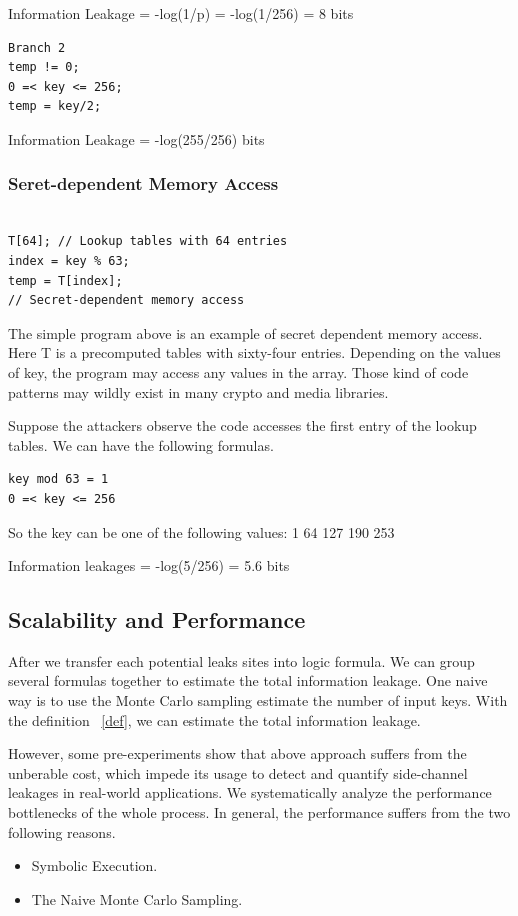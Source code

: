 Information Leakage = -log(1/p) = -log(1/256) = 8 bits

\begin{lstlisting}
Branch 2
temp != 0; 
0 =< key <= 256;
temp = key/2;
\end{lstlisting}

Information Leakage = -log(255/256) bits

\subsubsection{Seret-dependent Memory Access}

\begin{lstlisting}

T[64]; // Lookup tables with 64 entries
index = key % 63;
temp = T[index]; 
// Secret-dependent memory access       

\end{lstlisting}

The simple program above is an example of secret dependent memory access. 
Here T is a precomputed tables with sixty-four entries. 
Depending on the values of key, the program may access any values in the array. 
Those kind of code patterns may wildly exist in many crypto and media libraries. 

Suppose the attackers observe the code accesses the first entry of the lookup tables. 
We can have the following formulas.

\begin{lstlisting}
key mod 63 = 1
0 =< key <= 256
\end{lstlisting}

So the key can be one of the following values:
1 64 127 190 253

Information leakages = -log(5/256) =  5.6 bits


\subsection{Scalability and Performance}

After we transfer each potential leaks sites into logic formula. We can group several formulas together
to estimate the total information leakage. One naive way is to use the Monte Carlo sampling  estimate the
number of input keys. With the definition ~\ref{def}, we can estimate the total information leakage.

However, some pre-experiments show that above approach suffers from the unberable cost, which impede its usage
to detect and quantify side-channel leakages in real-world applications. 
We systematically analyze the performance bottlenecks of the whole process. In general, the performance suffers
from the two following reasons. 
\begin{itemize}
    \item Symbolic Execution. 
    \item The Naive Monte Carlo Sampling.
\end{itemize}
